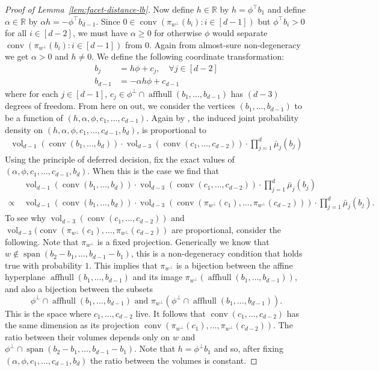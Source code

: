 \documentclass{theoretics}
\newcommand{\R}{\mathbb R}
\newcommand{\T}{\top}
\newcommand{\aff}{\operatorname{affhull}}
\newcommand{\conv}{\operatorname{conv}}
\newcommand{\vol}{\operatorname{vol}}
\begin{document}
\begin{proof}[Proof of Lemma~\ref{lem:facet-distance-lb}]
Now define $h \in \R$ by $h = \phi^\T b_1$ and define $\alpha \in \R$
by $\alpha h = - \phi^\T b_{d-1}$.
Since $0 \in \conv(\pi_{w^\perp}(b_i) : i \in [d-1])$ but $\phi^\T b_i > 0$ for all $i \in [d-2]$,
we must have $\alpha \geq 0$ for otherwise $\phi$ would separate $\conv(\pi_{w^\perp}(b_i) : i \in [d-1])$ from $0$.
Again from almost-sure non-degeneracy we get $\alpha > 0$ and $h \neq 0$.
We define the following coordinate transformation:
\begin{align*}
    b_j &= h\phi + c_j, \quad \forall j \in [d-2] \\
    b_{d-1} &= - \alpha h \phi + c_{d-1}
\end{align*}
where for each $j \in [d-1]$, $c_j \in \phi^\perp \cap \aff(b_1, \ldots, b_{d-1})$ has $(d-3)$ degrees of freedom.
From here on out, we consider the vertices $(b_1, \ldots,  b_{d-1})$
to be a function of $(h,\alpha, \phi, c_1,\dots,c_{d-1})$.
Again by ,
the induced joint probability density on $(h,\alpha, \phi, c_1,\dots,c_{d-1}, b_d)$,
is proportional to
\begin{align*}
\vol_{d-1}(\conv(b_1,\dots,b_d)) \cdot
\vol_{d-3}(\conv(c_1, \ldots, c_{d-2})) \cdot
\prod_{j=1}^d \bar{\mu}_j(b_j)
\end{align*}
Using the principle of deferred decision,
fix the exact values of $(\alpha, \phi, c_1,\dots,c_{d-1}, b_d)$.
When this is the case we find that
\begin{align*}
& \vol_{d-1}(\conv(b_1,\dots,b_d)) \cdot
\vol_{d-3}(\conv(c_1, \ldots, c_{d-2})) \cdot
\prod_{j=1}^d \bar{\mu}_j(b_j) \\
\propto ~ & \vol_{d-1}(\conv(b_1,\dots,b_d)) \cdot
\vol_{d-3}(\conv(\pi_{w^\perp}(c_1),\dots,\pi_{w^\perp}(c_{d-2}))) \cdot
\prod_{j=1}^d \bar{\mu}_j(b_j).
\end{align*}
To see why $\vol_{d-3}(\conv(c_{1}, \dots, c_{d-2}))$ and $\vol_{d-3}(\conv(\pi_{w^\perp}(c_{1}),\dots, \pi_{w^\perp}(c_{d-2}))$ are proportional, consider the following.
Note that $\pi_{w^\perp}$ is a fixed projection.
Generically we know that $w \notin \operatorname{span}(b_2-b_1,\dots,b_{d-1}-b_1)$,
this is a non-degeneracy condition that holds true with probability $1$.
This implies that $\pi_{w^\perp}$ is a bijection between the affine hyperplane
$\aff(b_1,\dots,b_{d-1})$ and its image $\pi_{w^\perp}(\aff(b_1,\dots,b_{d-1}))$,
and also a bijection between the subsets
\[
\phi^\perp \cap \aff(b_1,\dots,b_{d-1}) \text{~and~} \pi_{w^\perp}(\phi^\perp \cap \aff(b_1,\dots,b_{d-1})).
\]
This is the space where $c_1,\dots,c_{d-2}$ live. It follows that
$\conv(c_1, \ldots, c_{d-2})$ has the same dimension as
its projection 
$\conv(\pi_{w^\perp}(c_1),\dots,\pi_{w^\perp}(c_{d-2}))$.
The ratio between their volumes depends only on $w$ and
$\phi^\perp \cap \operatorname{span}(b_2-b_1,\dots,b_{d-1}-b_1)$.
Note that $h = \phi^\perp b_1$ and so, after fixing $(\alpha, \phi, c_1,\dots,c_{d-1}, b_d)$
the ratio between the volumes is constant.


\end{proof}
\end{document}
